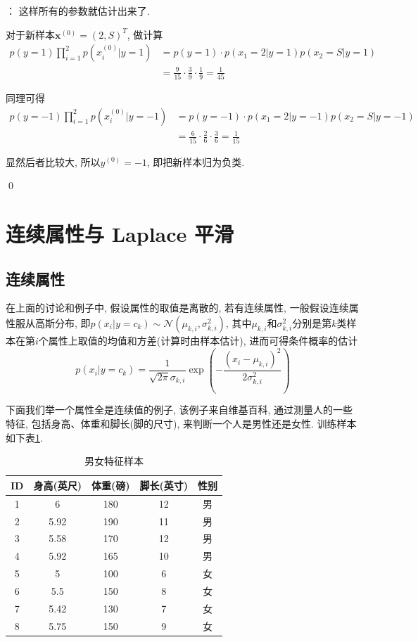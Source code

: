 \documentclass[a4paper,UTF8]{ctexart}
\theoremstyle{plain} \newtheorem{theorem}{定理}[section]
\theoremstyle{plain} \newtheorem{definition}{定义}[section]
\theoremstyle{plain} \newtheorem{lemma}{引理}[section]
\theoremstyle{plain} \newtheorem{proposition}{命题}[section]
\theoremstyle{plain} \newtheorem{example}{例}[section]
\theoremstyle{plain} \newtheorem{remark}{注}[section]
\theoremstyle{plain} \newtheorem{corollary}{推论}[section]
\newenvironment{mysolution}{{\color{blue} 解}： }{{\color{magenta}\qed}}
\begin{document}
\begin{mysolution}
这样所有的参数就估计出来了.

对于新样本$\bm{x}^{(0)} = (2, S)^{T}$, 做计算
\begin{align*}
p(y = 1) \prod_{i=1}^{2} p(x_{i}^{(0)} | y = 1) & = p(y = 1) \cdot p(x_1 = 2 | y = 1) p(x_2  = S | y = 1) \\ 
& = \frac{9}{15} \cdot \frac{3}{9} \cdot \frac{1}{9} = \frac{1}{45}
\end{align*}

同理可得
\begin{align*}
p(y = -1) \prod_{i=1}^{2} p(x_{i}^{(0)} | y = -1) & = p(y = -1) \cdot p(x_1 = 2 | y = -1) p(x_2  = S | y = -1) \\ 
& = \frac{6}{15} \cdot \frac{2}{6} \cdot \frac{3}{6} = \frac{1}{15}
\end{align*}

显然后者比较大, 所以$y^{(0)} = -1$, 即把新样本归为负类.

\end{mysolution}


\section{连续属性与 Laplace 平滑}
\subsection{连续属性}
在上面的讨论和例子中, 假设属性的取值是离散的, 若有连续属性, 一般假设连续属性服从高斯分布, 即$p(x_i | y = c_k) \sim \mathcal{N}(\mu_{k,i}, \sigma_{k,i}^2)$, 其中$\mu_{k,i}$和$\sigma_{k,i}^2$分别是第$k$类样本在第$i$个属性上取值的均值和方差(计算时由样本估计), 进而可得条件概率的估计
\begin{equation*}
p(x_i | y = c_k) = \frac{1}{\sqrt{2 \pi} \sigma_{k,i}} \exp \left( - \frac{(x_i - \mu_{k,i})^2}{2 \sigma_{k,i}^2} \right)
\end{equation*}


下面我们举一个属性全是连续值的例子, 该例子来自维基百科, 通过测量人的一些特征, 包括身高、体重和脚长(脚的尺寸), 来判断一个人是男性还是女性. 训练样本如下表\ref{gendersample}.
\begin{table}[!htb]
\centering
\caption{男女特征样本}
\label{gendersample}
\begin{tabular}{ccccc}
	\hline
	ID & 身高(英尺) & 体重(磅) &  脚长(英寸)  & 性别 \\
	\hline 
	1 & 6 & 180 & 12 & 男 \\ 
	\hline
	2 & 5.92 & 190 & 11 & 男 \\ 
	\hline
	3 & 5.58 & 170 & 12 & 男 \\ 
	\hline
	4 & 5.92 & 165 & 10 & 男 \\ 
	\hline
	5 & 5 & 100 & 6 & 女 \\ 
	\hline
	6 & 5.5 & 150 & 8 & 女 \\ 
	\hline
	7 & 5.42 & 130 & 7 & 女 \\ 
	\hline
	8 & 5.75 & 150 & 9 & 女 \\ 
	\hline
\end{tabular}
\end{table}
\end{document}
